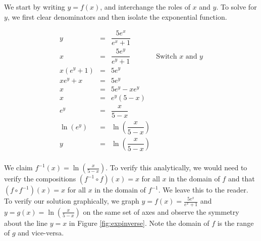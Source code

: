 {We start by writing $y=f(x)$, and interchange the roles of $x$ and $y$.  To solve for $y$, we first clear denominators and then isolate the exponential function.

\[ \begin{array}{rclr}
y & = & \dfrac{5e^{x}}{e^{x}+1} & \\ [12pt]
x & = & \dfrac{5e^{y}}{e^{y}+1} & \mbox{Switch $x$ and $y$} \\ [12pt]
x \left(e^{y}+1\right) & = & 5e^{y} & \\ [4pt]
x e^{y}+x & = & 5e^{y} & \\ [4pt]
x & = & 5e^{y} - x e^{y} & \\ [4pt]
x & = & e^{y}(5 - x) & \\ [4pt]
e^{y}& = & \dfrac{x}{5-x} & \\[12pt]
\ln\left(e^{y}\right) & = & \ln\left(\dfrac{x}{5-x}\right) & \\[12pt]
y & = & \ln\left(\dfrac{x}{5-x}\right) & \\
\end{array}\]

We claim $f^{-1}(x) = \ln\left(\frac{x}{5-x}\right)$.  To verify this analytically, we would need to verify the compositions $\left(f^{-1} \circ f\right)(x) = x$ for all $x$ in the domain of $f$ and that $\left(f \circ f^{-1}\right)(x) = x$ for all $x$ in the domain of $f^{-1}$.  We leave this to the reader.  To verify our solution graphically, we graph $y = f(x) = \frac{5e^{x}}{e^{x}+1}$ and $y = g(x) = \ln\left(\frac{x}{5-x}\right)$ on the same set of axes and observe the symmetry about the line $y=x$ in Figure \ref{fig:expinverse}.  Note the domain of $f$ is the range of $g$ and vice-versa.

{}
}

